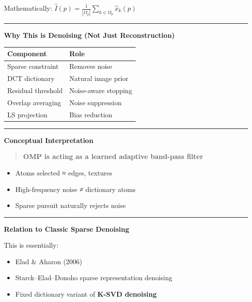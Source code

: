 \documentclass[11pt]{article}
\providecommand{\tightlist}{%
      \setlength{\itemsep}{0pt}\setlength{\parskip}{0pt}}
\begin{document}
Mathematically:
\(\hat{I}(p) = \frac{1}{|\Omega_p|} \sum\limits_{k \in \Omega_p} \hat{x}_k(p)\)

\begin{center}\rule{0.5\linewidth}{0.5pt}\end{center}

\textbf{Why This is Denoising (Not Just Reconstruction)}

\begin{longtable}[]{@{}ll@{}}
\toprule
Component & Role \\
\midrule
\endhead
Sparse constraint & Removes noise \\
DCT dictionary & Natural image prior \\
Residual threshold & Noise-aware stopping \\
Overlap averaging & Noise suppression \\
LS projection & Bias reduction \\
\bottomrule
\end{longtable}

\begin{center}\rule{0.5\linewidth}{0.5pt}\end{center}

\textbf{Conceptual Interpretation}

\begin{quote}
\textbf{OMP is acting as a learned adaptive band-pass filter}
\end{quote}

\begin{itemize}
\tightlist
\item
  Atoms selected ≈ edges, textures
\item
  High-frequency noise ≠ dictionary atoms
\item
  Sparse pursuit naturally rejects noise
\end{itemize}

\begin{center}\rule{0.5\linewidth}{0.5pt}\end{center}

\textbf{Relation to Classic Sparse Denoising}

This is essentially:

\begin{itemize}
\tightlist
\item
  Elad \& Aharon (2006)
\item
  Starck--Elad--Donoho sparse representation denoising
\item
  Fixed dictionary variant of \textbf{K-SVD denoising}
\end{itemize}
\end{document}
